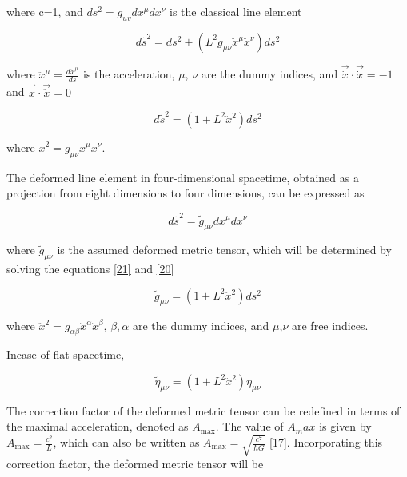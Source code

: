 \documentclass{article}
\begin{document}
where c=1, and $ds^2=g_{uv}dx^\mu dx^\nu$ is the classical line element

\begin{equation}
    d\widetilde{s}^2 = ds^2 + (L^2 g_{\mu\nu} \ddot{x}^{\mu} \ddot{x}^{\nu}) ds^2
\label{19}
\end{equation}

where $\ddot x^\mu=\frac{d\dot x^\mu}{ds}$ is the acceleration, $\mu$, $\nu$ are the dummy indices, and $\vec{\dot x} \cdot \Vec{\dot x}=-1$ and $\vec{\dot x} \cdot \vec{\ddot x}=0$



\begin{equation}
     d\widetilde{s}^2=(1 + L^2 \ddot{x}^2)ds^2
\label{21}
\end{equation}

where $\ddot x^2=g_{\mu \nu}\ddot x^\mu \ddot x^\nu$.

The deformed line element in four-dimensional spacetime, obtained as a projection from eight dimensions to four dimensions, can be expressed as

\begin{equation}
    d\widetilde{s}^2=\widetilde{g}_{\mu\nu}dx^{\mu} dx^{\nu}
    \label{20}
\end{equation}

where $\widetilde{g}_{\mu \nu}$ is the assumed deformed metric tensor, which will be determined by solving the equations \eqref{21} and \eqref{20}

\begin{equation}
    \widetilde{g}_{\mu\nu} = (1 + L^2 \ddot{x}^2)ds^2
 \label{18}
\end{equation}

where $\ddot x^2=g_{\alpha \beta}\ddot x^\alpha \ddot x^\beta$, $\beta,\alpha$ are the dummy indices, and $\mu$,$\nu$ are free indices.

Incase of  flat spacetime,

    \begin{equation}
\widetilde{\eta}_{\mu\nu} = \left(1 + L^2 \ddot{x}^2\right)\eta_{\mu\nu}
\label{17}
\end{equation}

The correction factor of the deformed metric tensor can be redefined in terms of the maximal acceleration, denoted as $A_{\text{max}}$. The value of $A_max$ is given by $A_{\text{max}} = \frac{c^2}{L}$, which can also be written as $A_{\text{max}} = \sqrt{\frac{c^7}{\hbar G}}$ [17]. Incorporating this correction factor, the deformed metric tensor will be
\end{document}
